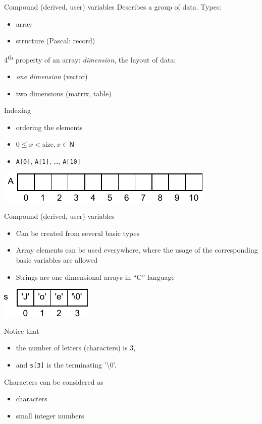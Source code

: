 \documentclass[usenames,dvipsnames,aspectratio=169]{beamer}
\begin{document}
\begin{frame}{Compound (derived, user) variables}
  Describes a group of data. Types:
  \begin{itemize}
    \item array
    \item structure (Pascal: record)
  \end{itemize}
  4\textsuperscript{th} property of an array: \emph{dimension}, the layout of data:
  \begin{itemize}
    \item \emph{one dimension} (vector)
    \item two dimensions (matrix, table)
  \end{itemize}
  Indexing
  \begin{itemize}
    \item ordering the elements
    \item $0 \leq x < \textrm{size}, x\in\mathsf{N}$
    \item \texttt{A[0]}, \texttt{A[1]}, \dots, \texttt{A[10]}
  \end{itemize}
  \vfill
  \begin{center}
    \includegraphics{./vector.pdf}
  \end{center}
\end{frame}

\begin{frame}{Compound (derived, user) variables}
  \begin{itemize}
    \item Can be created from several basic types
    \item Array elements can be used everywhere, where the usage of the corresponding basic variables are allowed
    \item Strings are one dimensional arrays in ``C'' language
  \end{itemize}
  \vfill
  \begin{center}
    \includegraphics{./string.pdf}
  \end{center}
  \vfill
  Notice that
  \begin{itemize}
    \item the number of letters (characters) is 3,
    \item and \texttt{s[3]} is the terminating '\textbackslash0'.
  \end{itemize}
  Characters can be considered as
  \begin{itemize}
    \item characters
    \item small integer numbers
  \end{itemize}
\end{frame}
\end{document}

